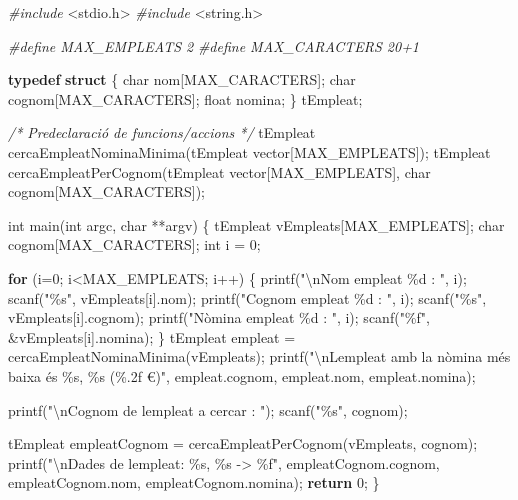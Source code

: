 \documentclass[
]{book}
\newenvironment{Shaded}{\begin{snugshade}}{\end{snugshade}}
\newcommand{\CommentTok}[1]{\textcolor[rgb]{0.56,0.35,0.01}{\textit{#1}}}
\newcommand{\ControlFlowTok}[1]{\textcolor[rgb]{0.13,0.29,0.53}{\textbf{#1}}}
\newcommand{\DataTypeTok}[1]{\textcolor[rgb]{0.13,0.29,0.53}{#1}}
\newcommand{\DecValTok}[1]{\textcolor[rgb]{0.00,0.00,0.81}{#1}}
\newcommand{\ImportTok}[1]{#1}
\newcommand{\KeywordTok}[1]{\textcolor[rgb]{0.13,0.29,0.53}{\textbf{#1}}}
\newcommand{\NormalTok}[1]{#1}
\newcommand{\PreprocessorTok}[1]{\textcolor[rgb]{0.56,0.35,0.01}{\textit{#1}}}
\newcommand{\SpecialCharTok}[1]{\textcolor[rgb]{0.00,0.00,0.00}{#1}}
\newcommand{\StringTok}[1]{\textcolor[rgb]{0.31,0.60,0.02}{#1}}
\begin{document}
\begin{Shaded}
\begin{Highlighting}[]
\PreprocessorTok{\#include }\ImportTok{\textless{}stdio.h\textgreater{}}
\PreprocessorTok{\#include }\ImportTok{\textless{}string.h\textgreater{}}

\PreprocessorTok{\#define MAX\_EMPLEATS 2}
\PreprocessorTok{\#define MAX\_CARACTERS 20+1}

\KeywordTok{typedef} \KeywordTok{struct}\NormalTok{ \{}
    \DataTypeTok{char}\NormalTok{ nom[MAX\_CARACTERS];}
    \DataTypeTok{char}\NormalTok{ cognom[MAX\_CARACTERS];}
    \DataTypeTok{float}\NormalTok{ nomina;}
\NormalTok{\} tEmpleat;}

\CommentTok{/* Predeclaració de funcions/accions */}
\NormalTok{tEmpleat cercaEmpleatNominaMinima(tEmpleat vector[MAX\_EMPLEATS]);}
\NormalTok{tEmpleat cercaEmpleatPerCognom(tEmpleat vector[MAX\_EMPLEATS], }\DataTypeTok{char}\NormalTok{ cognom[MAX\_CARACTERS]);}

\DataTypeTok{int}\NormalTok{ main(}\DataTypeTok{int}\NormalTok{ argc, }\DataTypeTok{char}\NormalTok{ **argv) \{}
\NormalTok{    tEmpleat vEmpleats[MAX\_EMPLEATS];}
    \DataTypeTok{char}\NormalTok{ cognom[MAX\_CARACTERS];}
    \DataTypeTok{int}\NormalTok{ i = }\DecValTok{0}\NormalTok{;}

    \ControlFlowTok{for}\NormalTok{ (i=}\DecValTok{0}\NormalTok{; i\textless{}MAX\_EMPLEATS; i++) \{}
\NormalTok{        printf(}\StringTok{"}\SpecialCharTok{\textbackslash{}n}\StringTok{Nom empleat \%d : "}\NormalTok{, i);}
\NormalTok{        scanf(}\StringTok{"\%s"}\NormalTok{, vEmpleats[i].nom);}
\NormalTok{        printf(}\StringTok{"Cognom empleat \%d : "}\NormalTok{, i);}
\NormalTok{        scanf(}\StringTok{"\%s"}\NormalTok{, vEmpleats[i].cognom);}
\NormalTok{        printf(}\StringTok{"Nòmina empleat \%d : "}\NormalTok{, i);}
\NormalTok{        scanf(}\StringTok{"\%f"}\NormalTok{, \&vEmpleats[i].nomina);}
\NormalTok{    \}}
\NormalTok{    tEmpleat empleat = cercaEmpleatNominaMinima(vEmpleats);}
\NormalTok{    printf(}\StringTok{"}\SpecialCharTok{\textbackslash{}n}\StringTok{L\textquotesingle{}empleat amb la nòmina més baixa és \%s, \%s (\%.2f €)"}\NormalTok{, empleat.cognom, empleat.nom, empleat.nomina);}

\NormalTok{    printf(}\StringTok{"}\SpecialCharTok{\textbackslash{}n}\StringTok{Cognom de l\textquotesingle{}empleat a cercar : "}\NormalTok{);}
\NormalTok{    scanf(}\StringTok{"\%s"}\NormalTok{, cognom);}

\NormalTok{    tEmpleat empleatCognom = cercaEmpleatPerCognom(vEmpleats, cognom);}
\NormalTok{    printf(}\StringTok{"}\SpecialCharTok{\textbackslash{}n}\StringTok{Dades de l\textquotesingle{}empleat: \%s, \%s {-}\textgreater{} \%f"}\NormalTok{, empleatCognom.cognom, empleatCognom.nom, empleatCognom.nomina);}
    \ControlFlowTok{return} \DecValTok{0}\NormalTok{;}
\NormalTok{\}}


\end{Highlighting}
\end{Shaded}
\end{document}
